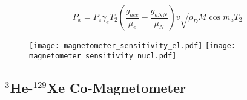 \documentclass[aps,prd,final,letterpaper]{revtex4}
\begin{document}
\begin{equation}
P_x = P_z\gamma_e T_2\left(\frac{g_{aee}}{\mu_e} - \frac{g_{aNN}}{\mu_N}\right)v\sqrt{\rho_DM}\cos{m_a T_2}
\end{equation}

\begin{figure}
\texttt{[image: magnetometer\_sensitivity\_el.pdf]}
\texttt{[image: magnetometer\_sensitivity\_nucl.pdf]}
\end{figure}


\subsection{$^{3}$He-$^{129}$Xe Co-Magnetometer}

\begingroup
\renewcommand{\section}[2]{}%
\begin{thebibliography}{100}


\end{thebibliography}
\end{document}

